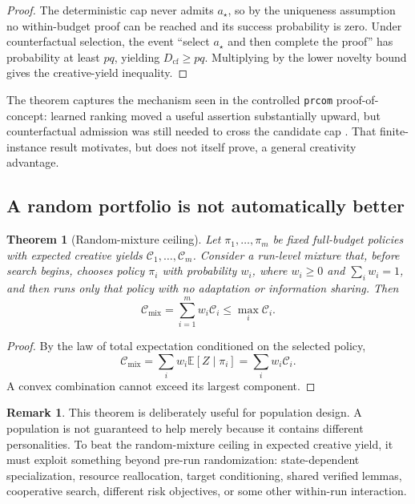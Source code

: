 \documentclass[11pt]{article}
\theoremstyle{datatheorem}
\newtheorem{theorem}{Theorem}[section]
\theoremstyle{definition}
\newtheorem{remark}{Remark}[section]
\newcommand{\E}{\mathbb{E}}
\newcommand{\cY}{\mathcal{C}}
\begin{document}
\begin{proof}
The deterministic cap never admits $a_\star$, so by the uniqueness assumption no within-budget proof can be reached and its success probability is zero. Under counterfactual selection, the event ``select $a_\star$ and then complete the proof'' has probability at least $pq$, yielding $D_{\mathrm{cf}}\ge pq$. Multiplying by the lower novelty bound gives the creative-yield inequality.
\end{proof}

The theorem captures the mechanism seen in the controlled \texttt{prcom} proof-of-concept: learned ranking moved a useful assertion substantially upward, but counterfactual admission was still needed to cross the candidate cap \cite{tennesonDepths47}. That finite-instance result motivates, but does not itself prove, a general creativity advantage.

\subsection{A random portfolio is not automatically better}

\begin{theorem}[Random-mixture ceiling]\label{thm:mixture}
Let $\pi_1,\dots,\pi_m$ be fixed full-budget policies with expected creative yields $\cY_1,\dots,\cY_m$. Consider a run-level mixture that, before search begins, chooses policy $\pi_i$ with probability $w_i$, where $w_i\ge 0$ and $\sum_iw_i=1$, and then runs only that policy with no adaptation or information sharing. Then
\[
\cY_{\mathrm{mix}}=\sum_{i=1}^m w_i\cY_i
\le \max_i\cY_i.
\]
\end{theorem}

\begin{proof}
By the law of total expectation conditioned on the selected policy,
\[
\cY_{\mathrm{mix}}
=\sum_i w_i\E[Z\mid\pi_i]
=\sum_iw_i\cY_i.
\]
A convex combination cannot exceed its largest component.
\end{proof}

\begin{remark}
This theorem is deliberately useful for population design. A population is not guaranteed to help merely because it contains different personalities. To beat the random-mixture ceiling in expected creative yield, it must exploit something beyond pre-run randomization: state-dependent specialization, resource reallocation, target conditioning, shared verified lemmas, cooperative search, different risk objectives, or some other within-run interaction.
\end{remark}
\end{document}
